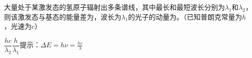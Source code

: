 大量处于某激发态的氢原子辐射出多条谱线，其中最长和最短波长分别为\(\lambda_1\)和\(\lambda_2\)，则该激发态与基态的能量差为\lunl{4em}，波长为\(\lambda_1\)的光子的动量为\lunl{4em}。（已知普朗克常量为\(h\)，光速为\(c\)）
\begin{answer}
	\(\dfrac{hc}{\lambda_2}\)\quad \(\dfrac{h}{\lambda_1}\)\qquad 提示：\(\Delta E = h\nu = \frac{hc}{\lambda}\)
\end{answer}